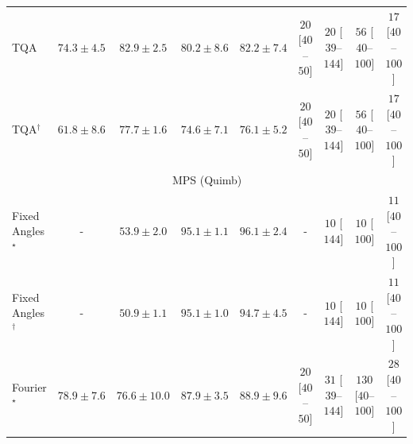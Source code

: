 \begin{tabular}{l|cccc|cccc|}
TQA & {\cellcolor[HTML]{8C91C4}} \color[HTML]{F1F1F1} $74.3\pm 4.5$ & {\cellcolor[HTML]{8A51A5}} \color[HTML]{F1F1F1} $82.9\pm 2.5$ & {\cellcolor[HTML]{8B65AE}} \color[HTML]{F1F1F1} $80.2\pm 8.6$ & {\cellcolor[HTML]{8A56A7}} \color[HTML]{F1F1F1} $82.2\pm 7.4$ & {\cellcolor[HTML]{FFF4F0}} \color[HTML]{000000} $20$ [$40$--$50$] & {\cellcolor[HTML]{FFF4F0}} \color[HTML]{000000} $20$ [$39$--$144$] & {\cellcolor[HTML]{FEEBE8}} \color[HTML]{000000} $56$ [$40$--$100$] & {\cellcolor[HTML]{FFF5F1}} \color[HTML]{000000} $17$ [$40$--$100$] \\
TQA$^\dagger$ & {\cellcolor[HTML]{C2D5E7}} \color[HTML]{000000} $61.8\pm 8.6$ & {\cellcolor[HTML]{8C78B7}} \color[HTML]{F1F1F1} $77.7\pm 1.6$ & {\cellcolor[HTML]{8C8FC2}} \color[HTML]{F1F1F1} $74.6\pm 7.1$ & {\cellcolor[HTML]{8C84BD}} \color[HTML]{F1F1F1} $76.1\pm 5.2$ & {\cellcolor[HTML]{FFF4F0}} \color[HTML]{000000} $20$ [$40$--$50$] & {\cellcolor[HTML]{FFF4F0}} \color[HTML]{000000} $20$ [$39$--$144$] & {\cellcolor[HTML]{FEEBE8}} \color[HTML]{000000} $56$ [$40$--$100$] & {\cellcolor[HTML]{FFF5F1}} \color[HTML]{000000} $17$ [$40$--$100$] \\
\cline{1-9}
\multicolumn{9}{c}{\rule{0pt}{8pt}MPS (Quimb)} \\
\midrule
Fixed Angles$^\star$ & {\cellcolor[HTML]{000000}} \color[HTML]{F1F1F1} {\cellcolor{white}} \color{black} - & {\cellcolor[HTML]{FFFBD0}} \color[HTML]{000000} $53.9\pm 2.0$ & {\cellcolor[HTML]{712806}} \color[HTML]{F1F1F1} $95.1\pm 1.1$ & {\cellcolor[HTML]{692606}} \color[HTML]{F1F1F1} $96.1\pm 2.4$ & {\cellcolor[HTML]{000000}} \color[HTML]{F1F1F1} {\cellcolor{white}} \color{black} - & {\cellcolor[HTML]{FFF7F3}} \color[HTML]{000000} $10$ [$144$] & {\cellcolor[HTML]{FFF7F3}} \color[HTML]{000000} $10$ [$100$] & {\cellcolor[HTML]{FFF6F2}} \color[HTML]{000000} $11$ [$40$--$100$] \\
Fixed Angles$^\dagger$ & {\cellcolor[HTML]{000000}} \color[HTML]{F1F1F1} {\cellcolor{white}} \color{black} - & {\cellcolor[HTML]{FFFFE5}} \color[HTML]{000000} $50.9\pm 1.1$ & {\cellcolor[HTML]{712806}} \color[HTML]{F1F1F1} $95.1\pm 1.0$ & {\cellcolor[HTML]{762A05}} \color[HTML]{F1F1F1} $94.7\pm 4.5$ & {\cellcolor[HTML]{000000}} \color[HTML]{F1F1F1} {\cellcolor{white}} \color{black} - & {\cellcolor[HTML]{FFF7F3}} \color[HTML]{000000} $10$ [$144$] & {\cellcolor[HTML]{FFF7F3}} \color[HTML]{000000} $10$ [$100$] & {\cellcolor[HTML]{FFF6F2}} \color[HTML]{000000} $11$ [$40$--$100$] \\
Fourier$^\star$ & {\cellcolor[HTML]{ED7316}} \color[HTML]{F1F1F1} $78.9\pm 7.6$ & {\cellcolor[HTML]{F5841E}} \color[HTML]{F1F1F1} $76.6\pm 10.0$ & {\cellcolor[HTML]{B34003}} \color[HTML]{F1F1F1} $87.9\pm 3.5$ & {\cellcolor[HTML]{A93C03}} \color[HTML]{F1F1F1} $88.9\pm 9.6$ & {\cellcolor[HTML]{FFF4F0}} \color[HTML]{000000} $20$ [$40$--$50$] & {\cellcolor[HTML]{FFF2EE}} \color[HTML]{000000} $31$ [$39$--$144$] & {\cellcolor[HTML]{FDD9D6}} \color[HTML]{000000} $130$ [$40$--$100$] & {\cellcolor[HTML]{FFF3EF}} \color[HTML]{000000} $28$ [$40$--$100$] \\

\end{tabular}
